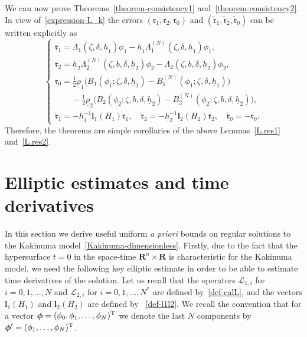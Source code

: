 \documentclass[11pt,leqno]{article}
\numberwithin{equation}{section}
\numberwithin{figure}{section}
\begin{document}
We can now prove Theorems~\ref{theorem-consistency1} and~\ref{theorem-consistency2}. 
In view of~\eqref{expression-L_k} the errors $(\mathfrak{r}_1,\mathfrak{r}_2,\mathfrak{r}_0)$ and 
$(\tilde{\bm{\mathfrak{r}}}_1,\tilde{\bm{\mathfrak{r}}}_2, \tilde{\mathfrak{r}}_0)$ can be written 
explicitly as 
%
\[
\begin{cases}
 \mathfrak{r}_1 = \Lambda_1(\zeta,\delta,\underline{h}_1)\phi_1
  - \underline{h}_1\Lambda_1^{(N)}(\zeta,\delta,\underline{h}_1)\phi_1, \\
 \mathfrak{r}_2 = \underline{h}_2\Lambda_2^{(N)}(\zeta,b,\delta,\underline{h}_2)\phi_2
  - \Lambda_2(\zeta,b,\delta,\underline{h}_2)\phi_2, \\
 \mathfrak{r}_0 = \frac12\underline{\rho}_1\bigl( B_1(\phi_1;\zeta,\delta,\underline{h}_1)
  - B_1^{(N)}(\phi_1;\zeta,\delta,\underline{h}_1) \bigr) \\
 \qquad
  - \frac12\underline{\rho}_2\bigl( B_2(\phi_2;\zeta,b,\delta,\underline{h}_2)
  - B_2^{(N)}(\phi_2;\zeta,b,\delta,\underline{h}_2) \bigr), \\
 \tilde{\bm{\mathfrak{r}}}_1 = -\underline{h}_1^{-1}\bm{l}_1(H_1)\mathfrak{r}_1, \quad
  \tilde{\bm{\mathfrak{r}}}_2 = -\underline{h}_2^{-1}\bm{l}_2(H_2)\mathfrak{r}_2, \quad
  \tilde{\mathfrak{r}}_0 = -\mathfrak{r}_0.
\end{cases}
\]
%
Therefore, the theorems are simple corollaries of the above Lemmas~\ref{L.res1} and~\ref{L.res2}. 


\section{Elliptic estimates and time derivatives}\label{S.elliptic}
%
In this section we derive useful uniform {\em a priori} bounds on regular solutions 
to the Kakinuma model~\eqref{Kakinuma-dimensionless}. 
Firstly, due to the fact that the hypersurface $t=0$ in the space-time $\mathbf{R}^n\times\mathbf{R}$ is 
characteristic for the Kakinuma model, we need the following key elliptic estimate in order to be able to 
estimate time derivatives of the solution. 
Let us recall that the operators  $\mathcal{L}_{1,i}$ for $i=0,1,\ldots,N$ and $\mathcal{L}_{2,i}$ for $i=0,1,\ldots,N^*$ 
are defined by~\eqref{def-calL}, and the vectors $\bm{l}_1(H_1)$ and $\bm{l}_2(H_2)$ are defined by ~\eqref{def-l1l2}. 
We recall the convention that for a vector $\mbox{\boldmath$\phi$}=(\phi_0,\phi_1,\ldots,\phi_N)^\mathrm{T}$ we denote the last $N$ 
components by $\mbox{\boldmath$\phi$}'=(\phi_1,\ldots,\phi_N)^\mathrm{T}$. 
\end{document}
